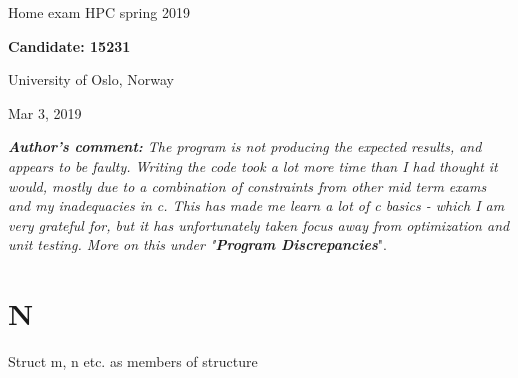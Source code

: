 \documentclass[%
oneside,                 %
final,                   %
10pt]{article}
\begin{document}

\newcommand{\exercisesection}[1]{\subsection*{#1}}






\thispagestyle{empty}

\begin{center}
{\LARGE\bf
\begin{spacing}{1.25}
Home exam HPC spring 2019
\end{spacing}
}
\end{center}


\begin{center}
{\bf Candidate: 15231}
\end{center}

    \begin{center}
\centerline{{\small University of Oslo, Norway}}
\end{center}
    

\begin{center}
Mar 3, 2019
\end{center}

\textit{\textbf{Author's comment:} The program is not producing the expected results, and appears to be faulty. Writing the code took a lot more time than I had thought it would, mostly due to a combination of  constraints from other mid term exams and my inadequacies in c. This has made me learn a lot of c basics - which I am very grateful for, but it has unfortunately taken focus away from optimization and unit testing.  More on this under "\textbf{Program Discrepancies}}".

\section{N}
Struct m, n etc. as members of structure
\end{document}
